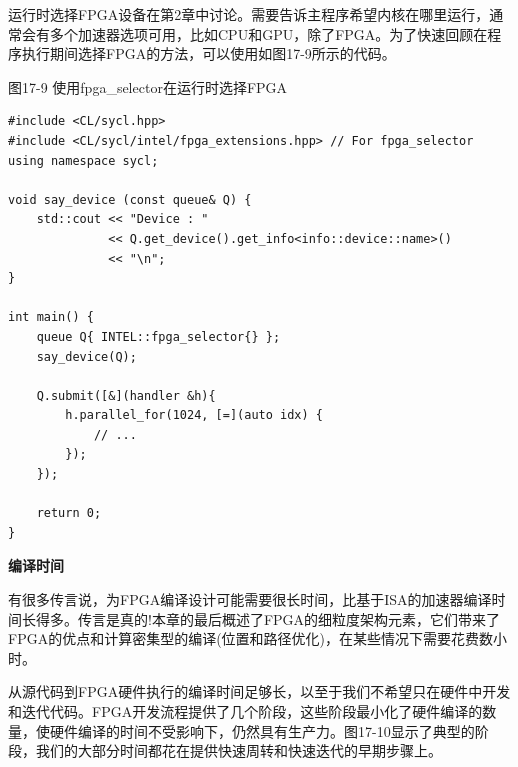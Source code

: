 运行时选择FPGA设备在第2章中讨论。需要告诉主程序希望内核在哪里运行，通常会有多个加速器选项可用，比如CPU和GPU，除了FPGA。为了快速回顾在程序执行期间选择FPGA的方法，可以使用如图17-9所示的代码。\par

\hspace*{\fill} \par %
图17-9 使用fpga\_selector在运行时选择FPGA
\begin{lstlisting}[caption={}]
#include <CL/sycl.hpp>
#include <CL/sycl/intel/fpga_extensions.hpp> // For fpga_selector
using namespace sycl;

void say_device (const queue& Q) {
	std::cout << "Device : "
			  << Q.get_device().get_info<info::device::name>() 
			  << "\n";
}

int main() {
	queue Q{ INTEL::fpga_selector{} };
	say_device(Q);
	
	Q.submit([&](handler &h){
		h.parallel_for(1024, [=](auto idx) {
			// ...
		});
	});

	return 0;
}
\end{lstlisting}

\hspace*{\fill} \par %
\textbf{编译时间}

有很多传言说，为FPGA编译设计可能需要很长时间，比基于ISA的加速器编译时间长得多。传言是真的!本章的最后概述了FPGA的细粒度架构元素，它们带来了FPGA的优点和计算密集型的编译(位置和路径优化)，在某些情况下需要花费数小时。\par

从源代码到FPGA硬件执行的编译时间足够长，以至于我们不希望只在硬件中开发和迭代代码。FPGA开发流程提供了几个阶段，这些阶段最小化了硬件编译的数量，使硬件编译的时间不受影响下，仍然具有生产力。图17-10显示了典型的阶段，我们的大部分时间都花在提供快速周转和快速迭代的早期步骤上。\par

